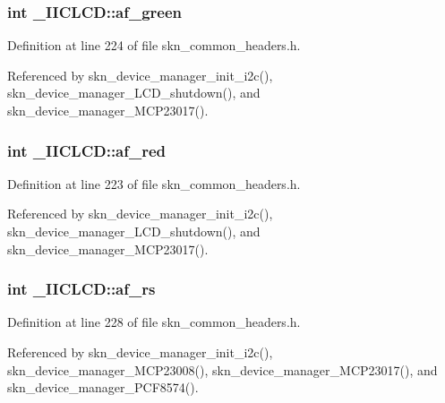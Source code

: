 \subsubsection[{af\+\_\+green}]{\setlength{\rightskip}{0pt plus 5cm}int \+\_\+\+I\+I\+C\+L\+C\+D\+::af\+\_\+green}\label{struct___i_i_c_l_c_d_a70176d63c9065d4186f55ae8328a82d3}


Definition at line 224 of file skn\+\_\+common\+\_\+headers.\+h.



Referenced by skn\+\_\+device\+\_\+manager\+\_\+init\+\_\+i2c(), skn\+\_\+device\+\_\+manager\+\_\+\+L\+C\+D\+\_\+shutdown(), and skn\+\_\+device\+\_\+manager\+\_\+\+M\+C\+P23017().

\hypertarget{struct___i_i_c_l_c_d_aca8ab39cfa9f683b2d03269886a0f633}{}
\subsubsection[{af\+\_\+red}]{\setlength{\rightskip}{0pt plus 5cm}int \+\_\+\+I\+I\+C\+L\+C\+D\+::af\+\_\+red}\label{struct___i_i_c_l_c_d_aca8ab39cfa9f683b2d03269886a0f633}


Definition at line 223 of file skn\+\_\+common\+\_\+headers.\+h.



Referenced by skn\+\_\+device\+\_\+manager\+\_\+init\+\_\+i2c(), skn\+\_\+device\+\_\+manager\+\_\+\+L\+C\+D\+\_\+shutdown(), and skn\+\_\+device\+\_\+manager\+\_\+\+M\+C\+P23017().

\hypertarget{struct___i_i_c_l_c_d_af738bf1e020daaa5476b917c375e807a}{}
\subsubsection[{af\+\_\+rs}]{\setlength{\rightskip}{0pt plus 5cm}int \+\_\+\+I\+I\+C\+L\+C\+D\+::af\+\_\+rs}\label{struct___i_i_c_l_c_d_af738bf1e020daaa5476b917c375e807a}


Definition at line 228 of file skn\+\_\+common\+\_\+headers.\+h.



Referenced by skn\+\_\+device\+\_\+manager\+\_\+init\+\_\+i2c(), skn\+\_\+device\+\_\+manager\+\_\+\+M\+C\+P23008(), skn\+\_\+device\+\_\+manager\+\_\+\+M\+C\+P23017(), and skn\+\_\+device\+\_\+manager\+\_\+\+P\+C\+F8574().

